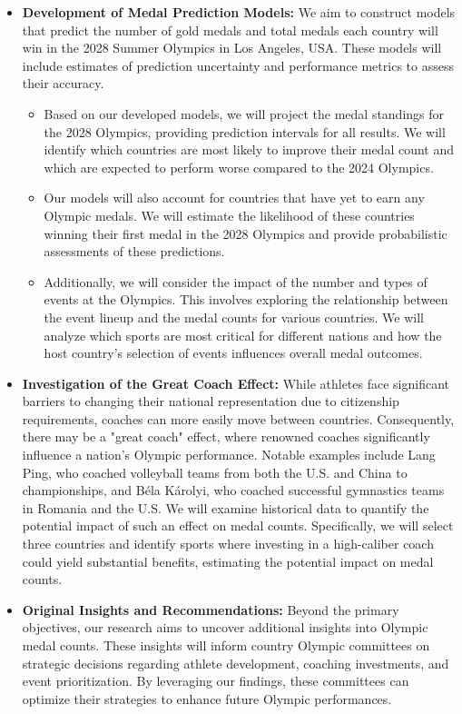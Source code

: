 \documentclass[12pt]{article}
\begin{document}
\begin{itemize}
    \item \textbf{Development of Medal Prediction Models:}
    We aim to construct models that predict the number of gold medals and total medals each country will win in the 2028 Summer Olympics in Los Angeles, USA. These models will include estimates of prediction uncertainty and performance metrics to assess their accuracy.

    \begin{itemize}
        \item Based on our developed models, we will project the medal standings for the 2028 Olympics, providing prediction intervals for all results. We will identify which countries are most likely to improve their medal count and which are expected to perform worse compared to the 2024 Olympics.
        
        \item Our models will also account for countries that have yet to earn any Olympic medals. We will estimate the likelihood of these countries winning their first medal in the 2028 Olympics and provide probabilistic assessments of these predictions.
        
        \item Additionally, we will consider the impact of the number and types of events at the Olympics. This involves exploring the relationship between the event lineup and the medal counts for various countries. We will analyze which sports are most critical for different nations and how the host country's selection of events influences overall medal outcomes.
    \end{itemize}

    \item \textbf{Investigation of the Great Coach Effect:}
    While athletes face significant barriers to changing their national representation due to citizenship requirements, coaches can more easily move between countries. Consequently, there may be a "great coach" effect, where renowned coaches significantly influence a nation's Olympic performance. Notable examples include Lang Ping, who coached volleyball teams from both the U.S. and China to championships, and Béla Károlyi, who coached successful gymnastics teams in Romania and the U.S. We will examine historical data to quantify the potential impact of such an effect on medal counts. Specifically, we will select three countries and identify sports where investing in a high-caliber coach could yield substantial benefits, estimating the potential impact on medal counts.

    \item \textbf{Original Insights and Recommendations:}
    Beyond the primary objectives, our research aims to uncover additional insights into Olympic medal counts. These insights will inform country Olympic committees on strategic decisions regarding athlete development, coaching investments, and event prioritization. By leveraging our findings, these committees can optimize their strategies to enhance future Olympic performances.
\end{itemize}
\graphicspath{{./images/}}
\end{document}
